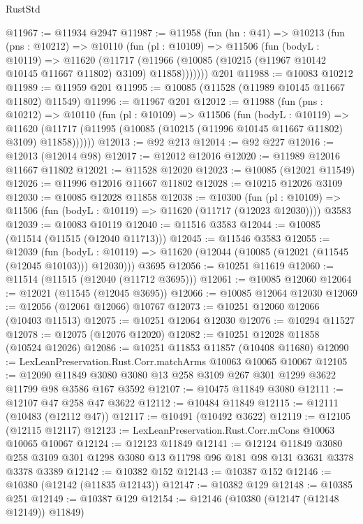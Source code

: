 \begin{lexlean}{RustStd}
\begin{coremodule}
@11967 := @11934 @2947
@11987 := @11958
    (fun (hn : @41) =>
    @10213
      (fun (pns : @10212) =>
      @10110
        (fun (pl : @10109) =>
        @11506
          (fun (bodyL : @10119) =>
          @11620
            (@11717
              (@11966 (@10085 (@10215 (@11967 @10142 @10145 @11667 @11802) @3109) @11858)))))))
    @201
@11988 := @10083 @10212
@11989 := @11959 @201
@11995 := @10085 (@11528 (@11989 @10145 @11667 @11802) @11549)
@11996 := @11967 @201
@12012 := @11988
    (fun (pns : @10212) =>
    @10110
      (fun (pl : @10109) =>
      @11506
        (fun (bodyL : @10119) =>
        @11620 (@11717 (@11995 (@10085 (@10215 (@11996 @10145 @11667 @11802) @3109) @11858))))))
@12013 := @92 @213
@12014 := @92 @227
@12016 := @12013 (@12014 @98)
@12017 := @12012 @12016
@12020 := @11989 @12016 @11667 @11802
@12021 := @11528 @12020
@12023 := @10085 (@12021 @11549)
@12026 := @11996 @12016 @11667 @11802
@12028 := @10215 @12026 @3109
@12030 := @10085 @12028 @11858
@12038 := @10300
    (fun (pl : @10109) => @11506 (fun (bodyL : @10119) => @11620 (@11717 (@12023 @12030))))
    @3583
@12039 := @10083 @10119
@12040 := @11516 @3583
@12044 := @10085 (@11514 (@11515 (@12040 @11713)))
@12045 := @11546 @3583
@12055 := @12039
    (fun (bodyL : @10119) => @11620 (@12044 (@10085 (@12021 (@11545 (@12045 @10103))) @12030)))
    @3695
@12056 := @10251 @11619
@12060 := @11514 (@11515 (@12040 (@11712 @3695)))
@12061 := @10085 @12060
@12064 := @12021 (@11545 (@12045 @3695))
@12066 := @10085 @12064 @12030
@12069 := @12056 (@12061 @12066) @10767
@12073 := @10251 @12060 @12066 (@10403 @11513)
@12075 := @10251 @12064 @12030
@12076 := @10294 @11527
@12078 := @12075 (@12076 @12020)
@12082 := @10251 @12028 @11858 (@10524 @12026)
@12086 := @10251 @11853 @11857 (@10408 @11680)
@12090 := LexLeanPreservation.Rust.Corr.matchArms @10063 @10065 @10067
@12105 := @12090 @11849 @3080 @3080 @13 @258 @3109 @267 @301 @1299 @3622 @11799 @98 @3586 @167 @3592
@12107 := @10475 @11849 @3080
@12111 := @12107 @47 @258 @47 @3622
@12112 := @10484 @11849
@12115 := @12111 (@10483 (@12112 @47))
@12117 := @10491 (@10492 @3622)
@12119 := @12105 (@12115 @12117)
@12123 := LexLeanPreservation.Rust.Corr.mCons @10063 @10065 @10067
@12124 := @12123 @11849
@12141 := @12124
    @11849
    @3080
    @258
    @3109
    @301
    @1298
    @3080
    @13
    @11798
    @96
    @181
    @98
    @131
    @3631
    @3378
    @3378
    @3389
@12142 := @10382 @152
@12143 := @10387 @152
@12146 := @10380 (@12142 (@11835 @12143))
@12147 := @10382 @129
@12148 := @10385 @251
@12149 := @10387 @129
@12154 := @12146 (@10380 (@12147 (@12148 @12149)) @11849)

\end{coremodule}
\end{lexlean}
